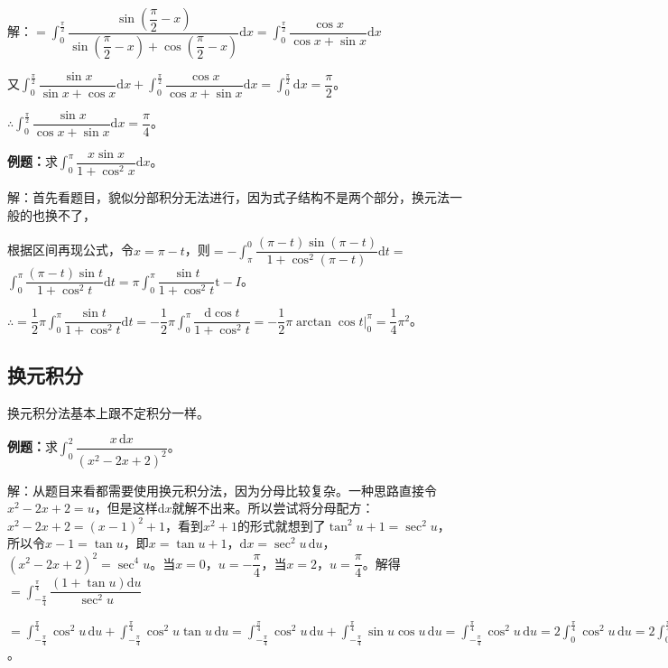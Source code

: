 \documentclass[UTF8, 12pt]{ctexart}
\begin{document}
解：$=\displaystyle{\int_0^\frac{\pi}{2}\dfrac{\sin(\dfrac{\pi}{2}-x)}{\sin(\dfrac{\pi}{2}-x)+\cos(\dfrac{\pi}{2}-x)}\textrm{d}x=\int_0^\frac{\pi}{2}\dfrac{\cos x}{\cos x+\sin x}\textrm{d}x}$

又$\displaystyle{\int_0^\frac{\pi}{2}\dfrac{\sin x}{\sin x+\cos x}\textrm{d}x+\int_0^\frac{\pi}{2}\dfrac{\cos x}{\cos x+\sin x}\textrm{d}x}$$=\int_0^\frac{\pi}{2}\textrm{d}x=\dfrac{\pi}{2}$。

$\therefore\displaystyle{\int_0^\frac{\pi}{2}\dfrac{\sin x}{\cos x+\sin x}\textrm{d}x}=\dfrac{\pi}{4}$。

\textbf{例题：}求$\displaystyle{\int_0^\pi}\dfrac{x\sin x}{1+\cos^2x}\textrm{d}x$。

解：首先看题目，貌似分部积分无法进行，因为式子结构不是两个部分，换元法一般的也换不了，

根据区间再现公式，令$x=\pi-t$，则$=-\displaystyle{\int_\pi^0\dfrac{(\pi-t)\sin(\pi-t)}{1+\cos^2(\pi-t)}\textrm{d}t}=$\\$\displaystyle{\int_0^\pi\dfrac{(\pi-t)\sin t}{1+\cos^2t}\textrm{d}t}=\pi\displaystyle{\int_0^\pi\dfrac{\sin t}{1+\cos^2t}\textrm{t}-I}$。

$\therefore=\dfrac{1}{2}\pi\displaystyle{\int_0^\pi\dfrac{\sin t}{1+\cos^2t}\textrm{d}t}=-\dfrac{1}{2}\pi\int_0^\pi\dfrac{\textrm{d}\cos t}{1+\cos^2t}=-\dfrac{1}{2}\pi\arctan\cos t\bigg|_0^\pi=\dfrac{1}{4}\pi^2$。

\subsection{换元积分}

换元积分法基本上跟不定积分一样。

\textbf{例题：}求$\displaystyle{\int_0^2\dfrac{x\,\textrm{d}x}{(x^2-2x+2)^2}}$。\medskip

解：从题目来看都需要使用换元积分法，因为分母比较复杂。一种思路直接令$x^2-2x+2=u$，但是这样$\textrm{d}x$就解不出来。所以尝试将分母配方：$x^2-2x+2=(x-1)^2+1$，看到$x^2+1$的形式就想到了$\tan^2u+1=\sec^2u$，所以令$x-1=\tan u$，即$x=\tan u+1$，$\textrm{d}x=\sec^2u\,\textrm{d}u$，$(x^2-2x+2)^2=\sec^4u$。当$x=0$，$u=-\dfrac{\pi}{4}$，当$x=2$，$u=\dfrac{\pi}{4}$。解得$=\displaystyle{\int_{-\frac{\pi}{4}}^\frac{\pi}{4}\dfrac{(1+\tan u)\textrm{d}u}{\sec^2u}}$

$=\int_{-\frac{\pi}{4}}^\frac{\pi}{4}\cos^2u\,\textrm{d}u+\int_{-\frac{\pi}{4}}^\frac{\pi}{4}\cos^2u\tan u\,\textrm{d}u=\int_{-\frac{\pi}{4}}^\frac{\pi}{4}\cos^2u\,\textrm{d}u+\int_{-\frac{\pi}{4}}^\frac{\pi}{4}\sin u\cos u\,\textrm{d}u=\int_{-\frac{\pi}{4}}^\frac{\pi}{4}\cos^2u\,\textrm{d}u=2\int_0^\frac{\pi}{4}\cos^2u\,\textrm{d}u=2\int_0^\frac{\pi}{4}(1+\cos2u)\,\textrm{d}u=\dfrac{\pi}{4}+\dfrac{1}{2}$。
\end{document}
